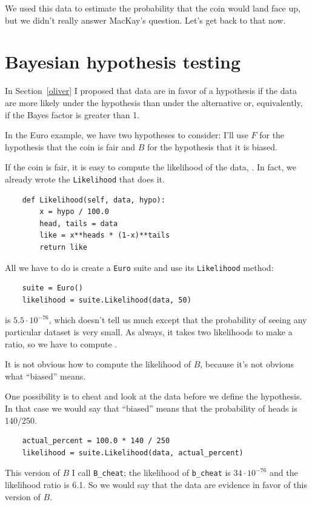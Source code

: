 \documentclass[12pt]{book}
\begin{document}
We used this data to estimate the probability that the coin would
land face up, but we didn't really answer MacKay's question.  Let's
get back to that now.

\section{Bayesian hypothesis testing}

In Section~\ref{oliver} I proposed that data are in favor of
a hypothesis if the data are more likely under the hypothesis than
under the alternative or, equivalently, if the Bayes factor is greater
than 1.

In the Euro example, we have two hypotheses to consider: I'll use
$F$ for the hypothesis that the coin is fair and $B$ for the hypothesis
that it is biased.

If the coin is fair, it is easy to compute the likelihood of the
data, .  In fact, we already wrote the {\tt Likelihood}
that does it.

\begin{verbatim}
    def Likelihood(self, data, hypo):
        x = hypo / 100.0
        head, tails = data
        like = x**heads * (1-x)**tails
        return like
\end{verbatim}

All we have to do is create a {\tt Euro} suite and use its 
{\tt Likelihood} method:

\begin{verbatim}
    suite = Euro()
    likelihood = suite.Likelihood(data, 50)
\end{verbatim}

 is $5.5 \cdot 10^{-76}$, which doesn't tell us much except
that the probability of seeing any particular dataset is very small.
As always, it takes two likelihoods to make a ratio, so we have to
compute .

It is not obvious how to compute the likelihood of $B$, because
it's not obvious what ``biased'' means.

One possibility is to cheat and look at the data before we define
the hypothesis.  In that case we would say that ``biased'' means that
the probability of heads is 140/250.

\begin{verbatim}
    actual_percent = 100.0 * 140 / 250
    likelihood = suite.Likelihood(data, actual_percent)
\end{verbatim}

This version of $B$ I call \verb"B_cheat"; the likelihood of
\verb"b_cheat" is $34 \cdot 10^{-76}$ and the likelihood ratio is
6.1.  So we would say that the data are evidence in favor of this
version of $B$.
\end{document}
